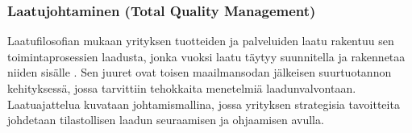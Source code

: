 \documentclass[finnish,12pt,a4paper,pdftex]{article}
\begin{document}





\subsubsection{Laatujohtaminen (Total Quality Management)}

Laatufilosofian mukaan yrityksen tuotteiden ja palveluiden laatu rakentuu sen toimintaprosessien laadusta, jonka vuoksi laatu täytyy suunnitella ja rakennetaa niiden sisälle \citep{teollisuustalous}. Sen juuret ovat toisen maailmansodan jälkeisen suurtuotannon kehityksessä, jossa tarvittiin tehokkaita menetelmiä laadunvalvontaan. Laatuajattelua kuvataan johtamismallina, jossa yrityksen strategisia tavoitteita johdetaan tilastollisen laadun seuraamisen ja ohjaamisen avulla. \\
\end{document}
